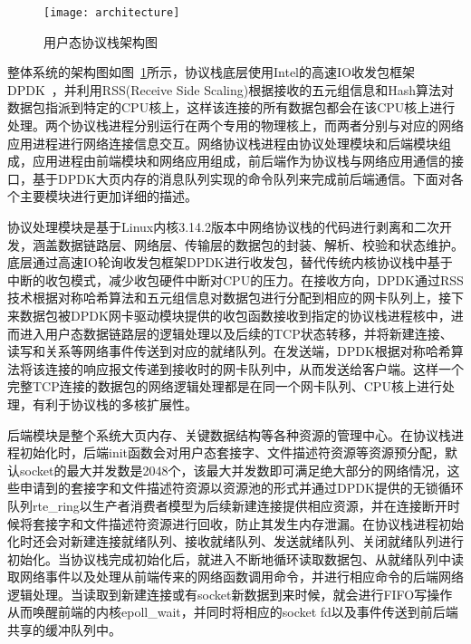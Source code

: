 \vspace{-10pt}
\begin{figure}[H] %
  \centering
  \texttt{[image: architecture]}
  \caption{用户态协议栈架构图}
  \label{fig:architecture}
\end{figure}
\vspace{-10pt}

整体系统的架构图如图~\ref{fig:architecture}所示，协议栈底层使用Intel的高速IO收发包框架DPDK~\cite{DPDK}，并利用RSS(Receive Side Scaling)根据接收的五元组信息和Hash算法对数据包指派到特定的CPU核上，这样该连接的所有数据包都会在该CPU核上进行处理。两个协议栈进程分别运行在两个专用的物理核上，而两者分别与对应的网络应用进程进行网络连接信息交互。网络协议栈进程由协议处理模块和后端模块组成，应用进程由前端模块和网络应用组成，前后端作为协议栈与网络应用通信的接口，基于DPDK大页内存的消息队列实现的命令队列来完成前后端通信。下面对各个主要模块进行更加详细的描述。

协议处理模块是基于Linux内核3.14.2版本中网络协议栈的代码进行剥离和二次开发，涵盖数据链路层、网络层、传输层的数据包的封装、解析、校验和状态维护。底层通过高速IO轮询收发包框架DPDK进行收发包，替代传统内核协议栈中基于中断的收包模式，减少收包硬件中断对CPU的压力。在接收方向，DPDK通过RSS技术根据对称哈希算法和五元组信息对数据包进行分配到相应的网卡队列上，接下来数据包被DPDK网卡驱动模块提供的收包函数接收到指定的协议栈进程核中，进而进入用户态数据链路层的逻辑处理以及后续的TCP状态转移，并将新建连接、读写和关系等网络事件传送到对应的就绪队列。在发送端，DPDK根据对称哈希算法将该连接的响应报文传递到接收时的网卡队列中，从而发送给客户端。这样一个完整TCP连接的数据包的网络逻辑处理都是在同一个网卡队列、CPU核上进行处理，有利于协议栈的多核扩展性。

后端模块是整个系统大页内存、关键数据结构等各种资源的管理中心。在协议栈进程初始化时，后端init函数会对用户态套接字、文件描述符资源等资源预分配，默认socket的最大并发数是2048个，该最大并发数即可满足绝大部分的网络情况，这些申请到的套接字和文件描述符资源以资源池的形式并通过DPDK提供的无锁循环队列rte\_ring以生产者消费者模型为后续新建连接提供相应资源，并在连接断开时候将套接字和文件描述符资源进行回收，防止其发生内存泄漏。在协议栈进程初始化时还会对新建连接就绪队列、接收就绪队列、发送就绪队列、关闭就绪队列进行初始化。当协议栈完成初始化后，就进入不断地循环读取数据包、从就绪队列中读取网络事件以及处理从前端传来的网络函数调用命令，并进行相应命令的后端网络逻辑处理。当读取到新建连接或有socket新数据到来时候，就会进行FIFO写操作从而唤醒前端的内核epoll\_wait，并同时将相应的socket fd以及事件传送到前后端共享的缓冲队列中。

